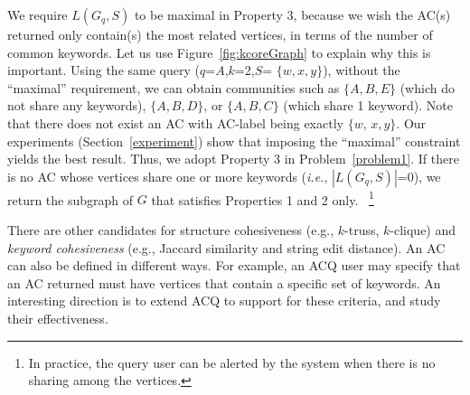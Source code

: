 We require $L(G_q, S)$ to be maximal in Property 3, because we wish the AC(s) returned only contain(s) the most related vertices, in terms of the number of common keywords. Let us use Figure~\ref{fig:kcoreGraph} to explain why this is important. Using the same query ($q$=$A$,$k$=2,$S$= $\{w,x,y\}$), without the ``maximal'' requirement, we can obtain communities such as $\{A,B,E\}$ (which do not share any keywords), $\{A,B,D\}$, or $\{A,B,C\}$ (which share 1 keyword). Note that there does not exist an AC with AC-label being exactly $\{w$, $x,y\}$.
Our experiments (Section~\ref{experiment}) show that imposing the ``maximal'' constraint yields the best result. Thus, we adopt Property 3 in Problem~\ref{problem1}.
If there is no AC whose vertices share one or more keywords
(\textit{i.e.}, $|L(G_q, S)|$=0), we return the subgraph of $G$ that satisfies Properties 1 and 2 only.
~\footnote{In practice, the query user can be alerted by the system when there is no sharing among the vertices.}

There are other candidates for structure cohesiveness (e.g., $k$-truss, $k$-clique) and  {\it keyword cohesiveness} (e.g., Jaccard similarity and string edit distance). An AC can also be defined in different ways. For example, an ACQ user may specify that an AC returned must have vertices that contain a specific set of keywords.
An interesting direction is to extend ACQ  to support for these criteria, and study their effectiveness.
